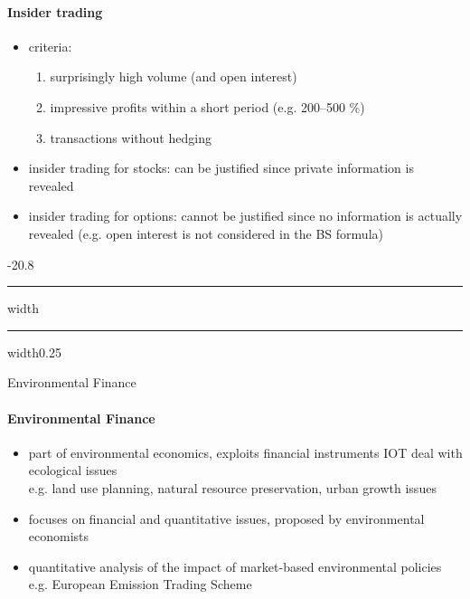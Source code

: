 \documentclass[a4paper,landscape,8pt,fleqn]{scrartcl}
\makeatletter
\renewcommand{\section}{\@startsection{section}{1}{0mm}%
{-2\baselineskip}{0.8\baselineskip}%
{\hrule depth 0.2pt width\columnwidth\hrule depth1.5pt
width0.25\columnwidth\vspace*{1.2em}\Large\bfseries}}
\makeatother
\begin{document}
\begin{multicols*}{4}
\paragraph{Insider trading}
\begin{itemize}
\item criteria:
\begin{enumerate}
\item surprisingly high volume (and open interest)
\item impressive profits within a short period (e.g. 200--500 \%)
\item transactions without hedging
\end{enumerate}
\item insider trading for stocks: can be justified since private information is revealed
\item insider trading for options: cannot be justified since no information is actually revealed (e.g. open interest is not considered in the BS formula)
\end{itemize}

\section{Environmental Finance}

\paragraph{Environmental Finance}
\begin{itemize}
\item part of environmental economics, exploits financial instruments IOT deal with ecological issues \\
e.g. land use planning, natural resource preservation, urban growth issues
\item focuses on financial and quantitative issues, proposed by environmental economists
\item quantitative analysis of the impact of market-based environmental policies \\
e.g. European Emission Trading Scheme
\end{itemize}


\end{multicols*}
\end{document}
